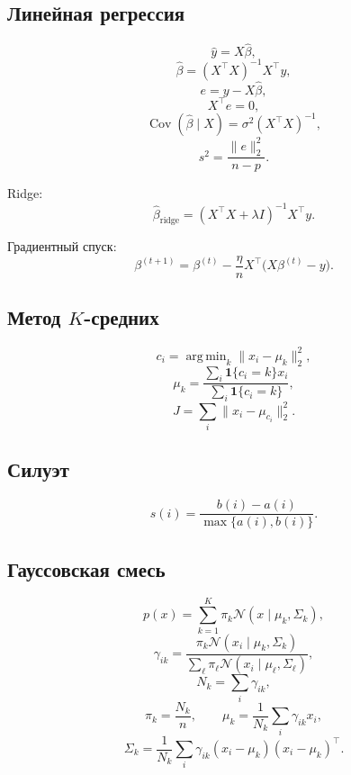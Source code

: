 \documentclass[12pt,a4paper]{article}
\theoremstyle{definition}
\theoremstyle{remark}
\newcommand{\Cov}{\operatorname{Cov}}
\DeclareMathOperator*{\argmin}{arg\,min}
\begin{document}
\subsection*{Линейная регрессия}

\[
    \widehat y=X\widehat\beta,
\]
\[
    \widehat\beta
    =
    (X^\top X)^{-1}X^\top y,
\]
\[
    e=y-X\widehat\beta,
\]
\[
    X^\top e=0,
\]
\[
    \Cov(\widehat\beta\mid X)
    =
    \sigma^2(X^\top X)^{-1},
\]
\[
    s^2
    =
    \frac{\|e\|_2^2}{n-p}.
\]

Ridge:
\[
    \widehat\beta_{\mathrm{ridge}}
    =
    (X^\top X+\lambda I)^{-1}X^\top y.
\]

Градиентный спуск:
\[
    \beta^{(t+1)}
    =
    \beta^{(t)}
    -
    \frac{\eta}{n}
    X^\top
    \bigl(X\beta^{(t)}-y\bigr).
\]

\subsection*{Метод $K$-средних}

\[
    c_i
    =
    \argmin_k\|x_i-\mu_k\|_2^2,
\]
\[
    \mu_k
    =
    \frac{
        \sum_i\mathbf{1}\{c_i=k\}x_i
    }{
        \sum_i\mathbf{1}\{c_i=k\}
    },
\]
\[
    J
    =
    \sum_i\|x_i-\mu_{c_i}\|_2^2.
\]

\subsection*{Силуэт}

\[
    s(i)
    =
    \frac{b(i)-a(i)}{\max\{a(i),b(i)\}}.
\]

\subsection*{Гауссовская смесь}

\[
    p(x)
    =
    \sum_{k=1}^{K}
    \pi_k\mathcal{N}(x\mid\mu_k,\Sigma_k),
\]
\[
    \gamma_{ik}
    =
    \frac{
        \pi_k\mathcal{N}(x_i\mid\mu_k,\Sigma_k)
    }{
        \sum_{\ell}
        \pi_\ell\mathcal{N}(x_i\mid\mu_\ell,\Sigma_\ell)
    },
\]
\[
    N_k=\sum_i\gamma_{ik},
\]
\[
    \pi_k=\frac{N_k}{n},
\qquad
    \mu_k=\frac{1}{N_k}\sum_i\gamma_{ik}x_i,
\]
\[
    \Sigma_k
    =
    \frac{1}{N_k}
    \sum_i
    \gamma_{ik}
    (x_i-\mu_k)(x_i-\mu_k)^\top.
\]
\end{document}
